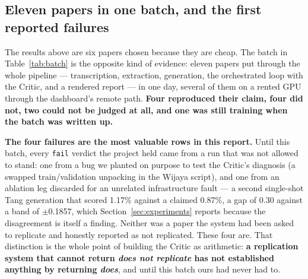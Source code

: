 \documentclass[10pt,twocolumn]{article}
\begin{document}
\subsection{Eleven papers in one batch, and the first reported failures}
\label{sec:batch}

The results above are six papers chosen because they are cheap. The batch in
Table~\ref{tab:batch} is the opposite kind of evidence: eleven papers put through the whole
pipeline --- transcription, extraction, generation, the orchestrated loop with the Critic, and a
rendered report --- in one day, several of them on a rented GPU through the dashboard's remote
path. \textbf{Four reproduced their claim, four did not, two could not be judged at all, and one
was still training when the batch was written up.}

\textbf{The four failures are the most valuable rows in this report.} Until this batch, every
\texttt{fail} verdict the project held came from a run that was not allowed to stand: one from a
bug we planted on purpose to test the Critic's diagnosis (a swapped train/validation unpacking
in the Wijaya script), and one from an ablation leg discarded for an unrelated infrastructure
fault --- a second single-shot Tang generation that scored 1.17\% against a claimed 0.87\%, a gap
of 0.30 against a band of $\pm$0.1857, which Section~\ref{sec:experiments} reports because the
disagreement is itself a finding. Neither was a paper the system had been asked to replicate and
honestly reported as not replicated. These four are. That distinction is the whole point of
building the Critic as arithmetic: \textbf{a replication system that cannot return
\emph{does not replicate} has not established anything by returning \emph{does}}, and until this
batch ours had never had to.
\end{document}
